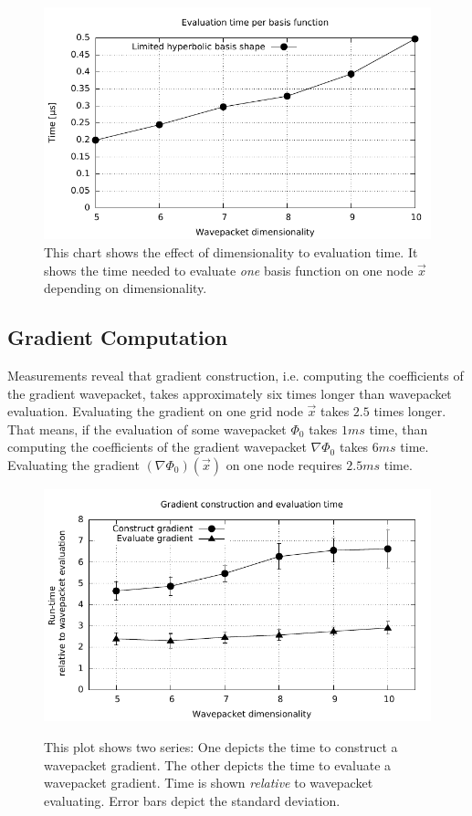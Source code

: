 \documentclass{article}
\begin{document}
\begin{figure}[H]
  \centering
  \includegraphics[width=1.0\textwidth]{plots/hawp_eval_efficiency}
  \caption{
    This chart shows the effect of dimensionality to evaluation time.
    It shows the time needed to evaluate \emph{one} basis function on one
    node \(\vec{x}\) depending on dimensionality.
  }
  \label{fig:hawp_eval_efficiency}
\end{figure}

\subsection{Gradient Computation}

Measurements reveal that gradient construction, i.e. computing the coefficients
of the gradient wavepacket, takes approximately six times longer than wavepacket evaluation.
Evaluating the gradient on one grid node \(\vec{x}\) takes \(2.5\) times longer.
That means, if the evaluation of some wavepacket \(\Phi_0\) takes \(1 ms\) time, than
computing the coefficients of the gradient wavepacket \(\nabla\Phi_0\) takes \(6ms\) time.
Evaluating the gradient \((\nabla \Phi_0)(\vec{x})\) on one node requires \(2.5 ms\) time.

\begin{figure}[H]
  \centering
  \includegraphics[width=1.0\textwidth]{plots/grad_reltime}
  \label{fig:grad_reltime}
  \caption{
    This plot shows two series: One depicts the time to construct a wavepacket gradient.
    The other depicts the time to evaluate a wavepacket gradient.
    Time is shown \emph{relative} to wavepacket evaluating.
    Error bars depict the standard deviation.
  }
\end{figure}
\end{document}
